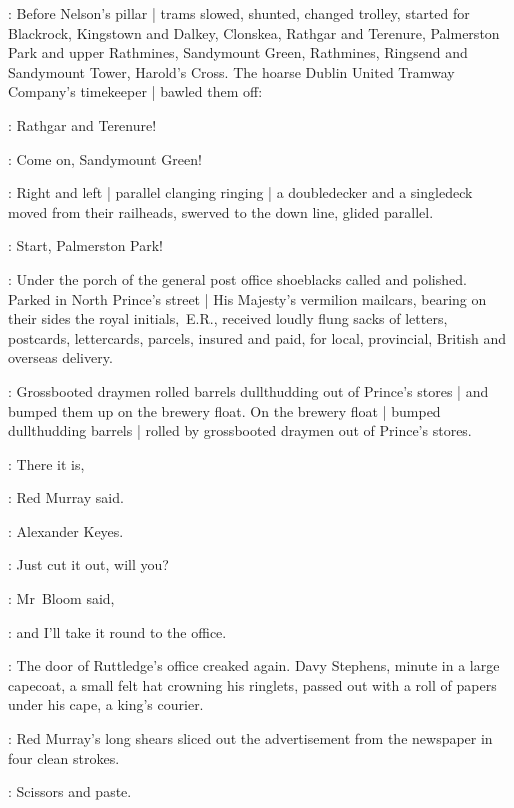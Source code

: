 
:
Before Nelson's pillar |
trams slowed,
shunted,
changed trolley,
started for Blackrock,
Kingstown and Dalkey,
Clonskea,
Rathgar and Terenure,
Palmerston Park and upper Rathmines,
Sandymount Green,
Rathmines,
Ringsend and Sandymount Tower,
Harold's Cross.
The hoarse Dublin United Tramway Company's timekeeper |
bawled them off:

\timekeeper:
Rathgar and Terenure!

\timekeeper:
Come on, Sandymount Green!

:
Right and left |
parallel clanging ringing |
a doubledecker and a singledeck moved from their railheads,
swerved to the down line,
glided parallel.

\timekeeper:
Start, Palmerston Park!



:
Under the porch of the general post office
shoeblacks called and polished.
Parked in North Prince's street |
His Majesty's vermilion mailcars,
bearing on their sides the royal initials,~E.R.,
received loudly flung sacks
of letters, postcards, lettercards, parcels, insured and paid,
for local, provincial, British and overseas delivery.



:
Grossbooted draymen rolled barrels dullthudding
out of Prince's stores |
and bumped them up on the brewery float.
On the brewery float |
bumped dullthudding barrels |
rolled by grossbooted draymen out of Prince's stores.

\redmurray:
There it is,

:
Red Murray said.

\redmurray:
Alexander Keyes.

\Bloom:
Just cut it out, will you?

:
Mr~Bloom said,

\Bloom:
and I'll take it round to the  office.

:
The door of Ruttledge's office creaked again.
Davy Stephens,
minute in a large capecoat,
a small felt hat crowning his ringlets,
passed out with a roll of papers under his cape,
a king's courier.

:
Red Murray's long shears sliced out the advertisement
from the newspaper in four clean strokes.

\BloomInt:
Scissors and paste.

